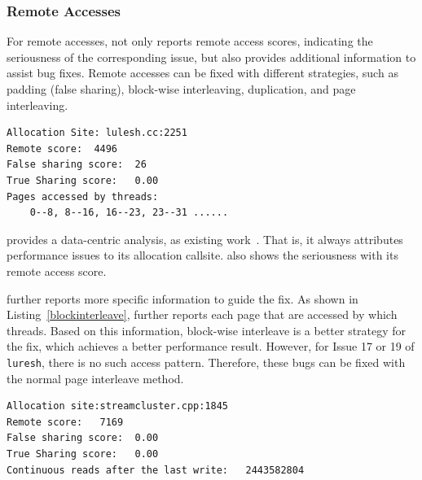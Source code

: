 \subsubsection{Remote Accesses}


For remote accesses, \NP{}  not only reports remote access scores, indicating the seriousness of the corresponding issue, but also provides additional information to assist bug fixes. Remote accesses can be fixed with different strategies, such as padding (false sharing), block-wise interleaving, duplication, and page interleaving. 

\begin{lstlisting}[caption={Remote access issue of lulesh },label={blockinterleave},captionpos=b]
Allocation Site: lulesh.cc:2251
Remote score:  4496
False sharing score:  26
True Sharing score:   0.00
Pages accessed by threads:
    0--8, 8--16, 16--23, 23--31 ......
\end{lstlisting}

\NP{} provides a data-centric analysis, as existing work~\cite{XuNuma}. That is, it always attributes performance issues to its allocation callsite. \NP{} also shows the seriousness with its remote access score.

\NP{} further reports more specific information to guide the fix. As shown in  Listing~\ref{blockinterleave}, \NP{} further reports each page that are accessed by which threads. Based on this information,  block-wise interleave is a better strategy for the fix, which achieves a better performance result. However, for Issue 17 or 19 of \texttt{luresh}, there is no such access pattern. Therefore, these bugs can be fixed with the normal page interleave method. 

\begin{lstlisting}[caption={Remote access issue of streamcluster},label={duplicate},captionpos=b]
Allocation site:streamcluster.cpp:1845
Remote score:   7169
False sharing score:  0.00
True Sharing score:   0.00
Continuous reads after the last write:   2443582804
\end{lstlisting}

